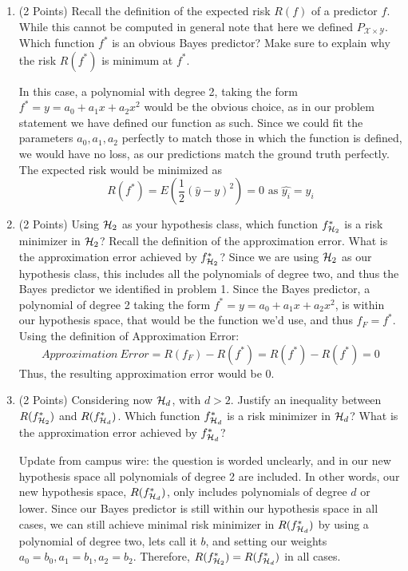 \documentclass{article}
\begin{document}
\begin{enumerate}
    \item (2 Points) Recall the definition of the expected risk $R(f)$ of a predictor $f$. While this cannot be computed in general note that here we defined $P_{\mathcal{X} \times \mathcal{Y}}$. Which function $f^*$ is an obvious Bayes predictor? Make sure to explain why the risk $R(f^*)$ is minimum at $f^*$.
    
    \subitem 
    In this case, a polynomial with degree 2, taking the form $f^* = y = a_0 + a_1x + a_2x^2$ would be the obvious choice, as in our problem statement we have defined our function as such. Since we could fit the parameters $a_0,a_1,a_2$ perfectly to match those in which the function is defined, we would have no loss, as our predictions match the ground truth perfectly. The expected risk would be minimized as $$
    R(f^*) = E(\frac{1}{2}(\hat{y}-y)^2) = 0 \text{ as } \hat{y_i} = y_i
    $$
    
    \item (2 Points) Using ${\mathcal{H}}_2$ as your hypothesis class, which function $f^*_{{\mathcal{H}}_2}$ is a risk minimizer in ${\mathcal{H}}_2$? Recall the definition of the approximation error. What is the approximation error achieved by $f^*_{{\mathcal{H}}_2}$?
    \subitem
    Since we are using ${\mathcal{H}}_2$ as our hypothesis class, this includes all the polynomials of degree two, and thus the Bayes predictor we identified in problem 1. Since the Bayes predictor, a polynomial of degree 2 taking the form $f^* = y = a_0 + a_1x + a_2x^2$, is within our hypothesis space, that would be the function we'd use, and thus $f_F = f^*$. Using the definition of Approximation Error:
    $$Approximation \ Error = R(f_F) - R(f^*) = R(f^*) - R(f^*) = 0$$
    Thus, the resulting approximation error would be 0.
    \item (2 Points) Considering now ${\mathcal{H}}_d$, with $d>2$. Justify an inequality between $R(f^*_{{\mathcal{H}}_2})$ and $R(f^*_{{\mathcal{H}}_d})$. Which function $f^*_{{\mathcal{H}}_d}$ is a risk minimizer in ${\mathcal{H}}_d$? What is the approximation error achieved by $f^*_{{\mathcal{H}}_d}$?
    
    \subitem Update from campus wire: the question is worded unclearly, and in our new hypothesis space all polynomials of degree 2 are included. In other words, our new hypothesis space, $R(f^*_{{\mathcal{H}}_d})$, only includes polynomials of degree $d$ or lower. Since our Bayes predictor is still within our hypothesis space in all cases, we can still achieve minimal risk minimizer in $R(f^*_{{\mathcal{H}}_d})$ by using a polynomial of degree two, lets call it $b$, and setting our weights $a_0=b_0, a_1=b_1, a_2=b_2$. 
    Therefore, $R(f^*_{{\mathcal{H}}_2}) = R(f^*_{{\mathcal{H}}_d})$ in all cases.
    

\end{enumerate}
\end{document}

